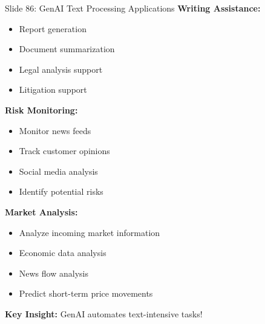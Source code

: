\documentclass[8pt]{beamer}
\begin{document}
	\begin{frame}{Slide 86: GenAI Text Processing Applications}
		\fontsize{6.5}{7.5}\selectfont
		\textbf{Writing Assistance:}
		\begin{itemize}
			\item Report generation
			\item Document summarization
			\item Legal analysis support
			\item Litigation support
		\end{itemize}
		
		\vspace{0.1cm}
		\textbf{Risk Monitoring:}
		\begin{itemize}
			\item Monitor news feeds
			\item Track customer opinions
			\item Social media analysis
			\item Identify potential risks
		\end{itemize}
		
		\vspace{0.1cm}
		\textbf{Market Analysis:}
		\begin{itemize}
			\item Analyze incoming market information
			\item Economic data analysis
			\item News flow analysis
			\item Predict short-term price movements
		\end{itemize}
		
		\textcolor{myblue}{\textbf{Key Insight:}} GenAI automates text-intensive tasks!
	\end{frame}
	
\end{document}
